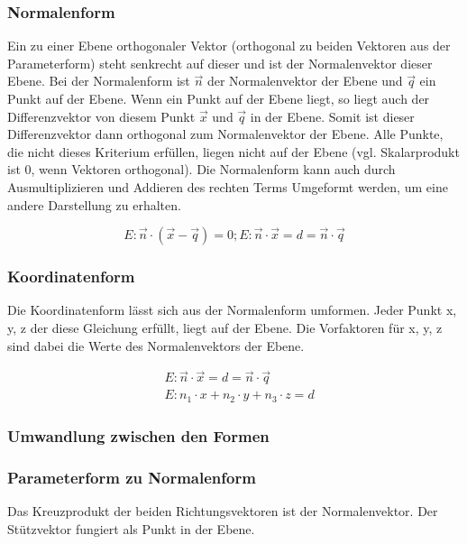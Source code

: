 \subsubsection{Normalenform}

Ein zu einer Ebene orthogonaler Vektor (orthogonal zu beiden Vektoren aus der Parameterform)
steht senkrecht auf dieser und ist der Normalenvektor dieser Ebene.
Bei der Normalenform ist $\vec{n}$ der Normalenvektor der Ebene und $\vec{q}$ ein Punkt
auf der Ebene. Wenn ein Punkt auf der Ebene liegt, so liegt auch der Differenzvektor von
diesem Punkt $\vec{x}$ und $\vec{q}$ in der Ebene. Somit ist dieser Differenzvektor dann
orthogonal zum Normalenvektor der Ebene. Alle Punkte, die nicht dieses Kriterium erfüllen,
liegen nicht auf der Ebene (vgl. Skalarprodukt ist 0, wenn Vektoren orthogonal).
Die Normalenform kann auch durch Ausmultiplizieren und Addieren des rechten Terms
Umgeformt werden, um eine andere Darstellung zu erhalten.

\begin{equation*}
    E: \vec{n} \cdot (\vec{x} - \vec{q}) = 0;
    E: \vec {n} \cdot \vec{x} = d = \vec{n} \cdot \vec{q}
\end{equation*}

\subsubsection{Koordinatenform}

Die Koordinatenform lässt sich aus der Normalenform umformen.
Jeder Punkt x, y, z der diese Gleichung erfüllt, liegt auf der Ebene.
Die Vorfaktoren für x, y, z sind dabei die Werte des Normalenvektors der Ebene.

\begin{align*}
    & E: \vec {n} \cdot \vec{x} = d = \vec{n} \cdot \vec{q} \\
    & E: n_1 \cdot x + n_2 \cdot y + n_3 \cdot z = d
\end{align*}

\subsubsection{Umwandlung zwischen den Formen}

\subsubsection*{Parameterform zu Normalenform}

Das Kreuzprodukt der beiden Richtungsvektoren ist der Normalenvektor.
Der Stützvektor fungiert als Punkt in der Ebene.


